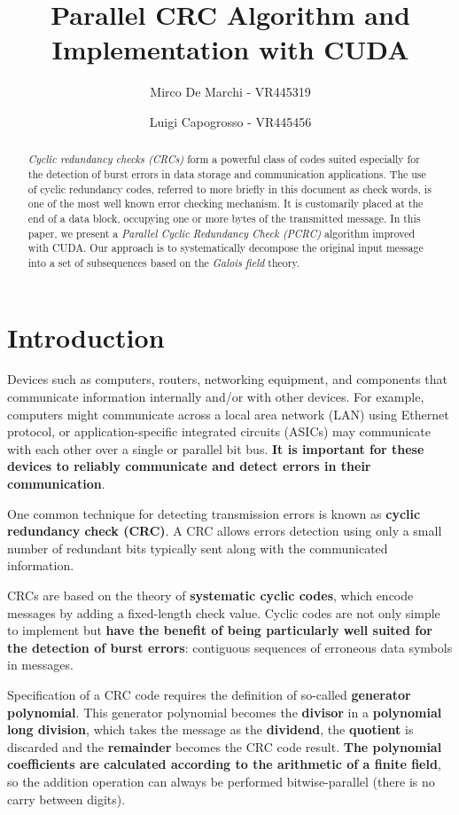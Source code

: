 \documentclass[fleqn]{IEEEtran}
\title
{
Parallel CRC Algorithm and Implementation with CUDA
}
\author{Mirco De Marchi - VR445319 \and Luigi Capogrosso - VR445456}
\begin{document}
\maketitle


\begin{abstract}
\textit{Cyclic redundancy checks (CRCs)} form a powerful class of codes suited 
especially for the detection of burst errors in data storage and communication 
applications. The use of cyclic redundancy codes, referred to more briefly 
in this document as check words, is one of the most well known error checking 
mechanism. It is customarily placed at the end of a data block, occupying one 
or more bytes of the transmitted message. In this paper, we present a 
\textit{Parallel Cyclic Redundancy Check (PCRC)} algorithm improved with CUDA. 
Our approach is to systematically decompose the original input message into a 
set of subsequences based on the \textit{Galois field} theory.
\end{abstract}


\section{Introduction}
Devices such as computers, routers, networking equipment, and components 
that communicate information internally and/or with other devices. For 
example, computers might communicate across a local area network (LAN) using 
Ethernet protocol, or application-specific integrated circuits (ASICs) may 
communicate with each other over a single or parallel bit bus. \textbf{It is 
important for these devices to reliably communicate and detect errors in 
their communication}.

One common technique for detecting transmission errors is known as 
\textbf{cyclic redundancy check (CRC)}. A CRC allows errors detection using 
only a small number of redundant bits typically sent along with the 
communicated information.

CRCs are based on the theory of \textbf{systematic cyclic codes}, which encode 
messages by adding a fixed-length check value. Cyclic codes are not only simple
to implement but \textbf{have the benefit of being particularly well suited 
for the detection of burst errors}: contiguous sequences of erroneous data 
symbols in messages.

Specification of a CRC code requires the definition of so-called 
\textbf{generator polynomial}. This generator polynomial becomes the \textbf{divisor} in a 
\textbf{polynomial long division}, which takes the message as the 
\textbf{dividend}, the \textbf{quotient} is discarded and the 
\textbf{remainder} becomes the CRC code result. \textbf{The 
polynomial coefficients are calculated according to the arithmetic of a finite 
field}, so the addition operation can always be performed bitwise-parallel 
(there is no carry between digits).
\end{document}
